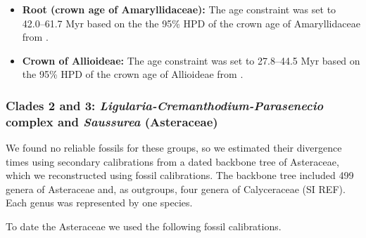 \documentclass[10pt]{article}
\begin{document}
\begin{itemize}

\item \textbf{Root (crown age of Amaryllidaceae):} The age constraint
  was set to 42.0--61.7 Myr based on the the 95\% HPD of the crown age
  of Amaryllidaceae from \cite{Chen2013}.

\item \textbf{Crown of Allioideae:} The age constraint was set to
  27.8--44.5 Myr based on the 95\% HPD of the crown age of Allioideae
  from \cite{Chen2013}.

\end{itemize}

\subsubsection*{Clades 2 and 3:
  \textit{Ligularia-Cremanthodium-Parasenecio} complex and
  \textit{Saussurea} (Asteraceae)}

We found no reliable fossils for these groups, so we estimated their
divergence times using secondary calibrations from a dated backbone
tree of Asteraceae, which we reconstructed using fossil
calibrations. The backbone tree included 499 genera of Asteraceae and,
as outgroups, four genera of Calyceraceae (SI REF). Each genus was
represented by one species.

To date the Asteraceae we used the following fossil calibrations.

\end{document}
